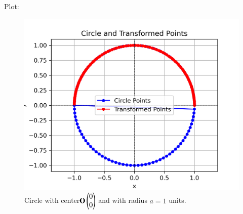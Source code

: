\documentclass[journal,12pt,onecolumn]{IEEEtran}
\theoremstyle{remark}
\begin{document}
Plot:
\begin{figure}[h!]
    \centering
	\includegraphics[scale=0.8]{figs/plot.png}
	\caption{Circle with center$\mathbf{O} \begin{pmatrix}0\\0\end{pmatrix}$ and with radius $a=1$ units.} 

    \label{fig:plot}
\end{figure}
\end{document}
